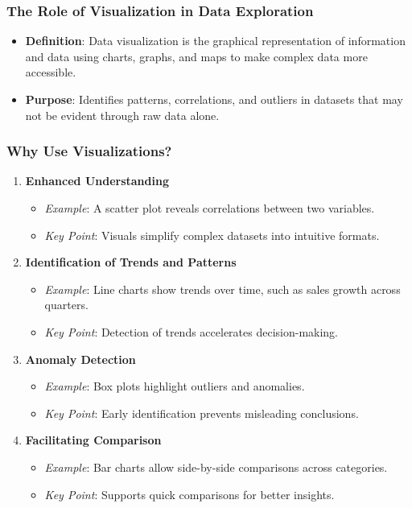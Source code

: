 \documentclass[aspectratio=169]{beamer}
\begin{document}
\begin{frame}[fragile]
    \frametitle{The Role of Visualization in Data Exploration}
    \begin{itemize}
        \item \textbf{Definition}: Data visualization is the graphical representation of information and data using charts, graphs, and maps to make complex data more accessible.
        \item \textbf{Purpose}: Identifies patterns, correlations, and outliers in datasets that may not be evident through raw data alone.
    \end{itemize}
\end{frame}

\begin{frame}[fragile]
    \frametitle{Why Use Visualizations?}
    \begin{enumerate}
        \item \textbf{Enhanced Understanding}
            \begin{itemize}
                \item \textit{Example}: A scatter plot reveals correlations between two variables.
                \item \textit{Key Point}: Visuals simplify complex datasets into intuitive formats.
            \end{itemize}
        \item \textbf{Identification of Trends and Patterns}
            \begin{itemize}
                \item \textit{Example}: Line charts show trends over time, such as sales growth across quarters.
                \item \textit{Key Point}: Detection of trends accelerates decision-making.
            \end{itemize}
        \item \textbf{Anomaly Detection}
            \begin{itemize}
                \item \textit{Example}: Box plots highlight outliers and anomalies.
                \item \textit{Key Point}: Early identification prevents misleading conclusions.
            \end{itemize}
        \item \textbf{Facilitating Comparison}
            \begin{itemize}
                \item \textit{Example}: Bar charts allow side-by-side comparisons across categories.
                \item \textit{Key Point}: Supports quick comparisons for better insights.
            \end{itemize}
    \end{enumerate}
\end{frame}
\end{document}
